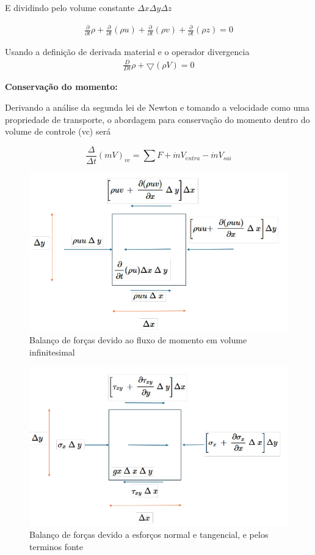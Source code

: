 \documentclass[]{article}
\begin{document}
E dividindo pelo volume constante $\Delta x \Delta y  \Delta z$

\begin{equation}
	\begin{aligned}
		\frac{\partial}{\partial t} \rho + \frac{\partial}{\partial t} (\rho u) + \frac{\partial}{\partial t} (\rho v) + \frac{\partial}{\partial t} (\rho z) = 0 
	\end{aligned}
\end{equation}

Usando a definição de derivada material e o operador divergencia
\begin{equation}
	\begin{aligned}
		\frac{D}{D t} \rho +  \bigtriangledown (\rho V)= 0 
	\end{aligned}
\end{equation}


\textbf{Conservação do momento:} 

Derivando a análise da segunda lei de Newton e tomando a velocidade como uma propriedade de transporte, o abordagem para conservação do momento dentro do volume de controle (vc) será

\begin{equation}
	\frac{\Delta }{\Delta t} (mV)_{vc}= \sum F +\dot{m}V_{entra} - \dot{m}V_{sai}
\end{equation}

\begin{figure}[H]
	\centering
	\includegraphics[width=.65\textwidth]{figures/1_2}
	\caption{Balanço de forças devido ao fluxo de momento em volume infinitesimal}
\end{figure}

\begin{figure}[H]
	\centering
	\includegraphics[width=.65\textwidth]{figures/1_3}
	\caption{Balanço de forças devido a esforços normal e tangencial, e pelos terminos fonte}
\end{figure}
\end{document}
